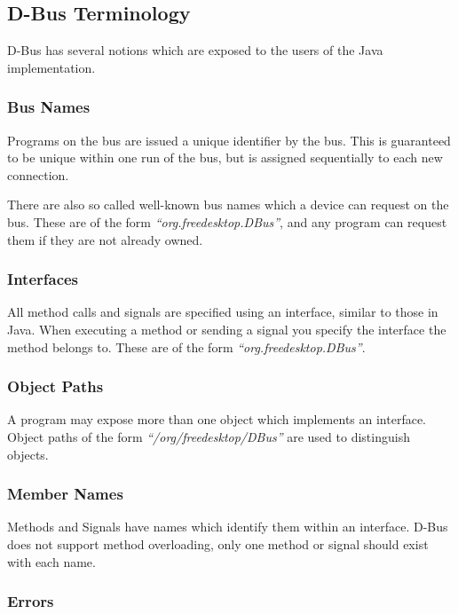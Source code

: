 \documentclass[a4paper,12pt]{article}
\begin{document}
\subsection{D-Bus Terminology}

D-Bus has several notions which are exposed to the users of the Java
implementation.

\subsubsection{Bus Names}

Programs on the bus are issued a unique identifier by the bus. This
is guaranteed to be unique within one run of the bus, but is
assigned sequentially to each new connection. 

There are also so called well-known bus names which a device can
request on the bus. These are of the form {\em ``org.freedesktop.DBus''},
and any program can request them if they are not already owned.

\subsubsection{Interfaces}

All method calls and signals are specified using an interface,
similar to those in Java. When executing a method or sending a
signal you specify the interface the method belongs to. These are of
the form {\em ``org.freedesktop.DBus''}.

\subsubsection{Object Paths}

A program may expose more than one object which implements an
interface. Object paths of the form {\em ``/org/freedesktop/DBus''}
are used to distinguish objects.

\subsubsection{Member Names}

Methods and Signals have names which identify them within an
interface. D-Bus does not support method overloading, only one
method or signal should exist with each name.

\subsubsection{Errors}
\end{document}
